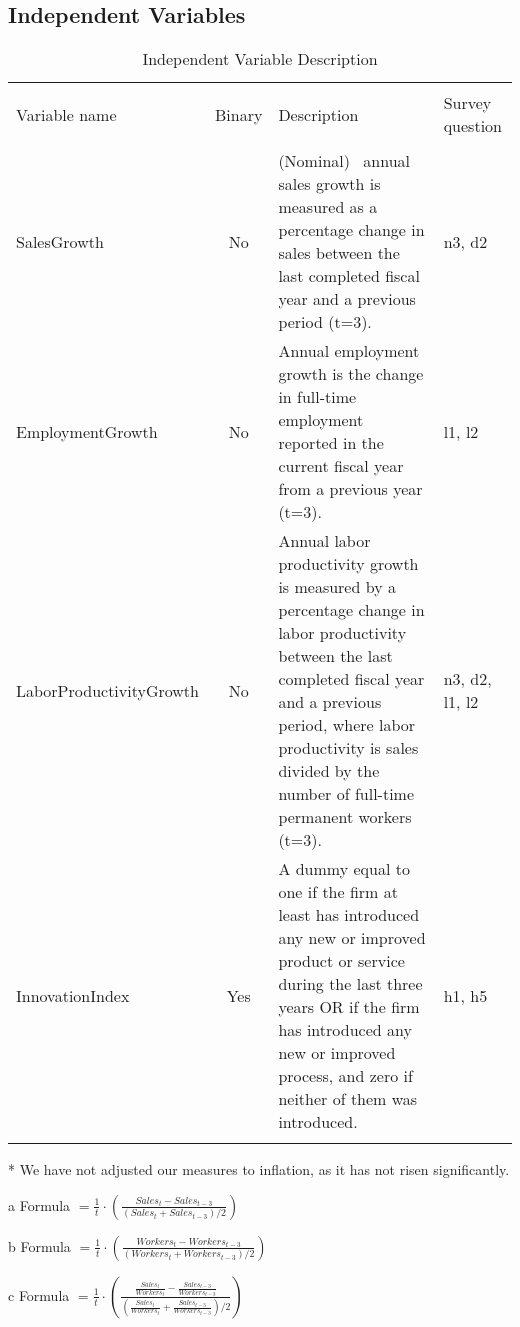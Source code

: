 \subsection{Independent Variables}
\begin{table}[!h] 
  \centering 
  \caption{Independent Variable Description} 
  \label{} 
  \begin{adjustbox}{width=\columnwidth,center}
  \begin{threeparttable}[b]
\begin{tabular}{@{\extracolsep{5pt}}lcp{10cm}p{2cm}} 
\\[-1.8ex]\hline 
\hline \\[-1.8ex] 
Variable name & \multicolumn{1}{c}{Binary} & Description & Survey question \\ 
\hline \\[-1.8ex] 
SalesGrowth\tnote{a} & No & (Nominal)\tnote{*} \, annual sales growth is measured as a percentage change in sales between the last completed fiscal year and a previous period (t=3). & n3, d2  \\ 
EmploymentGrowth\tnote{b} & No & Annual employment growth is the change in full-time employment reported in the current fiscal year from a previous year (t=3). & l1, l2  \\
LaborProductivityGrowth\tnote{c} & No & Annual labor productivity growth is measured by a percentage change in labor productivity between the last completed fiscal year and a previous period, where labor productivity is sales divided by the number of full-time permanent workers (t=3). & n3, d2, l1, l2  \\
InnovationIndex & Yes & A dummy equal to one if the firm at least has introduced any new or improved product or service during the last three years OR if the firm has introduced any new or improved process, and zero if neither of them was introduced. & h1, h5  \\ 
\hline \\[-1.8ex] 
\end{tabular}
   \begin{tablenotes}
     \item[*] We have not adjusted our measures to inflation, as it has not risen significantly.
     \item[a] Formula $=\frac{1}{t}\cdot(\frac{Sales_{t}-Sales_{t-3}} {{(Sales_{t}+Sales_{t-3})/2}}) $ \\
     \item[b] Formula $=\frac{1}{t}\cdot(\frac{Workers_{t}-Workers_{t-3}} {{(Workers_{t}+Workers_{t-3})/2}}) $ \\
     \item[c] Formula $=\frac{1}{t}\cdot(\frac{\frac{Sales_{t}}{Workers_{t}}-\frac{Sales_{t-3}}{Workers_{t-3}}} {{(\frac{Sales_{t}}{Workers_{t}}+\frac{Sales_{t-3}}{Workers_{t-3}})/2}}) $
   \end{tablenotes}
  \end{threeparttable}
\end{adjustbox}
\end{table}
